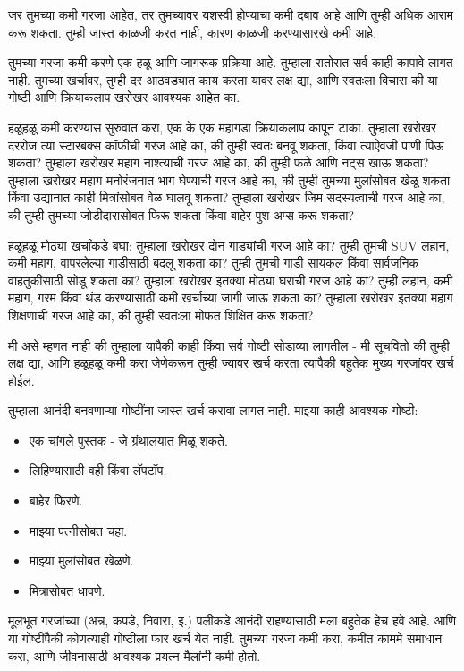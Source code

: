 जर तुमच्या कमी गरजा आहेत, तर तुमच्यावर यशस्वी होण्याचा कमी दबाव आहे आणि तुम्ही अधिक आराम करू शकता. तुम्ही जास्त काळजी करत नाही, कारण काळजी करण्यासारखे कमी आहे.

तुमच्या गरजा कमी करणे एक हळू आणि जागरूक प्रक्रिया आहे. तुम्हाला रातोरात सर्व काही कापावे लागत नाही. तुमच्या खर्चावर, तुम्ही दर आठवड्यात काय करता यावर लक्ष द्या, आणि स्वतःला विचारा की या गोष्टी आणि क्रियाकलाप खरोखर आवश्यक आहेत का.

हळूहळू कमी करण्यास सुरुवात करा, एक के एक महागडा क्रियाकलाप कापून टाका. तुम्हाला खरोखर दररोज त्या स्टारबक्स कॉफीची गरज आहे का, की तुम्ही स्वतः बनवू शकता, किंवा त्याऐवजी पाणी पिऊ शकता? तुम्हाला खरोखर महाग नाश्त्याची गरज आहे का, की तुम्ही फळे आणि नट्स खाऊ शकता? तुम्हाला खरोखर महाग मनोरंजनात भाग घेण्याची गरज आहे का, की तुम्ही तुमच्या मुलांसोबत खेळू शकता किंवा उद्यानात काही मित्रांसोबत वेळ घालवू शकता? तुम्हाला खरोखर जिम सदस्यत्वाची गरज आहे का, की तुम्ही तुमच्या जोडीदारासोबत फिरू शकता किंवा बाहेर पुश-अप्स करू शकता?

हळूहळू मोठ्या खर्चांकडे बघा: तुम्हाला खरोखर दोन गाड्यांची गरज आहे का? तुम्ही तुमची SUV लहान, कमी महाग, वापरलेल्या गाडीसाठी बदलू शकता का? तुम्ही तुमची गाडी सायकल किंवा सार्वजनिक वाहतुकीसाठी सोडू शकता का? तुम्हाला खरोखर इतक्या मोठ्या घराची गरज आहे का? तुम्ही लहान, कमी महाग, गरम किंवा थंड करण्यासाठी कमी खर्चाच्या जागी जाऊ शकता का? तुम्हाला खरोखर इतक्या महाग शिक्षणाची गरज आहे का, की तुम्ही स्वतःला मोफत शिक्षित करू शकता?

मी असे म्हणत नाही की तुम्हाला यापैकी काही किंवा सर्व गोष्टी सोडाव्या लागतील - मी सूचवितो की तुम्ही लक्ष द्या, आणि हळूहळू कमी करा जेणेकरून तुम्ही ज्यावर खर्च करता त्यापैकी बहुतेक मुख्य गरजांवर खर्च होईल.

तुम्हाला आनंदी बनवणाऱ्या गोष्टींना जास्त खर्च करावा लागत नाही. माझ्या काही आवश्यक गोष्टी:

\begin{itemize}
\item एक चांगले पुस्तक - जे ग्रंथालयात मिळू शकते.
\item लिहिण्यासाठी वही किंवा लॅपटॉप.
\item बाहेर फिरणे.
\item माझ्या पत्नीसोबत चहा.
\item माझ्या मुलांसोबत खेळणे.
\item मित्रासोबत धावणे.
\end{itemize}
मूलभूत गरजांच्या (अन्न, कपडे, निवारा, इ.) पलीकडे आनंदी राहण्यासाठी मला बहुतेक हेच हवे आहे. आणि या गोष्टींपैकी कोणत्याही गोष्टीला फार खर्च येत नाही.
तुमच्या गरजा कमी करा, कमीत काममे समाधान करा, आणि जीवनासाठी आवश्यक प्रयत्न मैलांनी कमी होतो.


